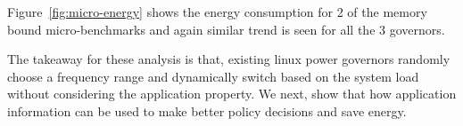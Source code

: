 Figure~\ref{fig:micro-energy} shows
the energy consumption for 2 of the memory bound micro-benchmarks and again similar trend is seen
for all the 3 governors.

The takeaway for these analysis is that, existing linux power governors randomly
choose a frequency range and dynamically switch based on the system load
without considering the application property. We next, show that how 
application information can be used to make better policy decisions and 
save energy.



